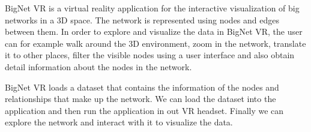 %
%



BigNet VR is a virtual reality application for the interactive visualization of big networks in a 3D space. The network is represented using nodes and edges between them. In order to explore and visualize the data in BigNet VR, the user can for example walk around the 3D environment, zoom in the network, translate it to other places, filter the visible nodes using a user interface and also obtain detail information about the nodes in the network.

BigNet VR loads a dataset that contains the information of the nodes and relationships that make up the network. We can load the dataset into the application and then run the application in out VR headset. Finally we can explore the network and interact with it to visualize the data.

